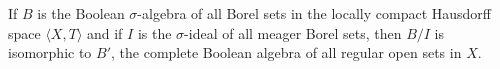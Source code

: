 If $B$ is the Boolean $\sigma$-algebra of all Borel sets in the locally compact Hausdorff space $\langle X, T \rangle$ and if $I$ is the $\sigma$-ideal of all meager Borel sets, then $B/I$ is isomorphic to $B'$, the complete Boolean algebra of all regular open sets in $X$.
